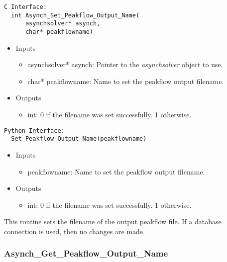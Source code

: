 \documentclass[12pt]{article}
\begin{document}
\begin{lstlisting}[style=CStyle]
  C Interface:
  int Asynch_Set_Peakflow_Output_Name(
      asynchsolver* asynch,
      char* peakflowname)
\end{lstlisting}
\begin{itemize}
 \item Inputs
  \begin{itemize}
   \item asynchsolver* asynch: Pointer to the \emph{asynchsolver} object to use.
   \item char* peakflowname: Name to set the peakflow output filename.
  \end{itemize}
 \item Outputs
  \begin{itemize}
   \item int: 0 if the filename was set successfully. 1 otherwise.
  \end{itemize}
\end{itemize}
\begin{lstlisting}[style=PythonStyle]
  Python Interface:
  Set_Peakflow_Output_Name(peakflowname)
\end{lstlisting}
\begin{itemize}
 \item Inputs
  \begin{itemize}
   \item peakflowname: Name to set the peakflow output filename.
  \end{itemize}
 \item Outputs
  \begin{itemize}
   \item int: 0 if the filename was set successfully. 1 otherwise.
  \end{itemize}
\end{itemize}
This routine sets the filename of the output peakflow file. If a database connection is used, then no changes are made.


\subsubsection{Asynch\_Get\_Peakflow\_Output\_Name} \label{sec: asynch_get_peakflow_output_name}
\end{document}
